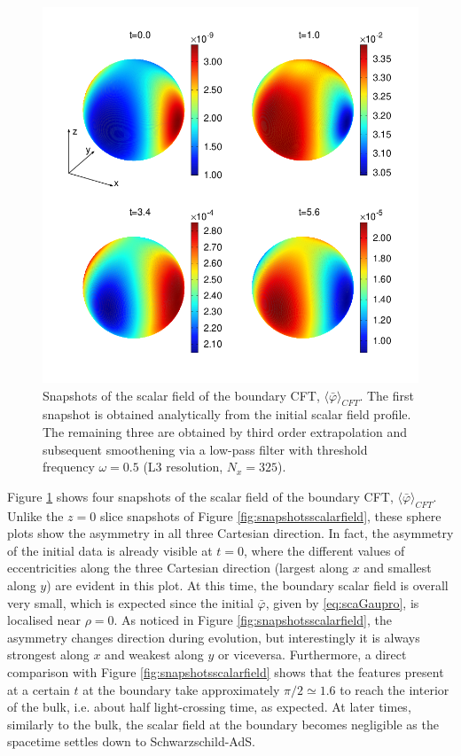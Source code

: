 \documentclass[a4paper,11pt]{article}
\begin{document}
\begin{figure}[!h]
        \centering
        \includegraphics[width=5.0in,clip=true]{plots/bdyplots/L3/bdyphi/sphereplots_bdyphi_L3_2by2.png}
\parbox{5.0in}{\caption{Snapshots of the scalar field of the boundary CFT, $\langle \bar{\varphi}\rangle_{CFT}$. The first snapshot is obtained analytically from the initial scalar field profile. The remaining three are obtained by third order extrapolation and subsequent smoothening via a low-pass filter with threshold frequency $\omega=0.5$ (L3 resolution, $N_x=325$).
        }\label{fig:snapshotsbdyphi}}
\end{figure}

Figure \ref{fig:snapshotsbdyphi} shows four snapshots of the scalar field of the boundary CFT, $\langle \bar{\varphi}\rangle_{CFT}$.
Unlike the $z=0$ slice snapshots of Figure \ref{fig:snapshotsscalarfield}, these sphere plots show the asymmetry in all three Cartesian direction. In fact, the asymmetry of the initial data is already visible at $t=0$, where the different values of eccentricities along the three Cartesian direction (largest along $x$ and smallest along $y$) are evident in this plot. At this time, the boundary scalar field is overall very small, which is expected since the initial $\bar{\varphi}$, given by \eqref{eq:scaGaupro}, is localised near $\rho=0$.
As noticed in Figure \ref{fig:snapshotsscalarfield}, the asymmetry changes direction during evolution, but interestingly it is always strongest along $x$ and weakest along $y$ or viceversa. Furthermore, a direct comparison with Figure \ref{fig:snapshotsscalarfield} shows that the features present at a certain $t$ at the boundary take approximately $\pi/2\simeq1.6$ to reach the interior of the bulk, i.e. about half light-crossing time, as expected. At later times, similarly to the bulk, the scalar field at the boundary becomes negligible as the spacetime settles down to Schwarzschild-AdS.
\end{document}

